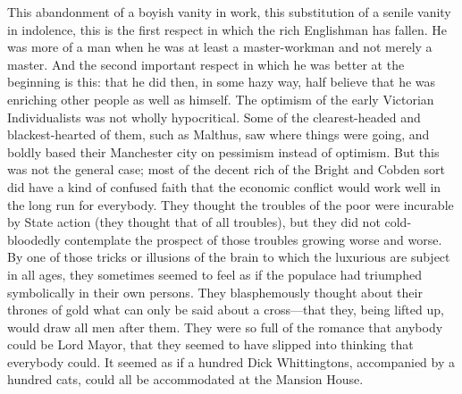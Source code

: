 \documentclass{book}
\begin{document}
This abandonment of a boyish vanity in work, this substitution of a senile vanity in indolence, this is the first respect in which the rich Englishman has fallen. He was more of a man when he was at least a master-workman and not merely a master. And the second important respect in which he was better at the beginning is this: that he did then, in some hazy way, half believe that he was enriching other people as well as himself. The optimism of the early Victorian Individualists was not wholly hypocritical. Some of the clearest-headed and blackest-hearted of them, such as Malthus, saw where things were going, and boldly based their Manchester city on pessimism instead of optimism. But this was not the general case; most of the decent rich of the Bright and Cobden sort did have a kind of confused faith that the economic conflict would work well in the long run for everybody. They thought the troubles of the poor were incurable by State action (they thought that of all troubles), but they did not cold-bloodedly contemplate the prospect of those troubles growing worse and worse. By one of those tricks or illusions of the brain to which the luxurious are subject in all ages, they sometimes seemed to feel as if the populace had triumphed symbolically in their own persons. They blasphemously thought about their thrones of gold what can only be said about a cross—that they, being lifted up, would draw all men after them. They were so full of the romance that anybody could be Lord Mayor, that they seemed to have slipped into thinking that everybody could. It seemed as if a hundred Dick Whittingtons, accompanied by a hundred cats, could all be accommodated at the Mansion House.
\end{document}
